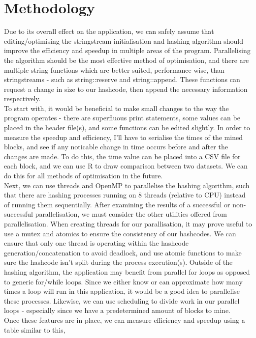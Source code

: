 \documentclass[12pt, a4paper]{article}
\begin{document}
\section{Methodology}
Due to its overall effect on the application, we can safely assume that editing/optimising the stringstream initialisation and hashing algorithm should improve the efficiency and speedup in multiple areas of the program. Parallelising the algorithm should be the most effective method of optimisation, and there are multiple string functions which are better suited, performance wise, than stringstreams - such as string::reserve and string::append. These functions can request a change in size to our hashcode, then append the necessary information respectively. \\
To start with, it would be beneficial to make small changes to the way the program operates - there are superfluous print statements, some values can be placed in the header file(s), and some functions can be edited slightly. In order to measure the speedup and efficiency, I'll have to serialise the times of the mined blocks, and see if any noticable change in time occurs before and after the changes are made. To do this, the time value can be placed into a CSV file for each block, and we can use R to draw comparison between two datasets. We can do this for all methods of optimisation in the future. \\
Next, we can use threads and OpenMP to parallelise the hashing algorithm, such that there are hashing processes running on 8 threads (relative to CPU) instead of running them sequentially. After examining the results of a successful or non-successful parallelisation, we must consider the other utilities offered from parallelisation. When creating threads for our parallisation, it may prove useful to use a mutex and atomics to ensure the consistency of our hashcodes. We can ensure that only one thread is operating within the hashcode generation/concatenation to avoid deadlock, and use atomic functions to make sure the hashcode isn't split during the process execution(s). Outside of the hashing algorithm, the application may benefit from parallel for loops as opposed to generic for/while loops. Since we either know or can approximate how many times a loop will run in this application, it would be a good idea to parallelise these processes. Likewise, we can use scheduling to divide work in our parallel loops - especially since we have a predetermined amount of blocks to mine. \\
Once these features are in place, we can measure efficiency and speedup using a table similar to this,
\end{document}
